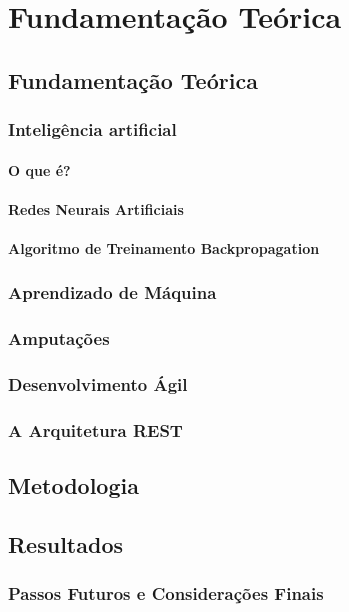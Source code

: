 \part{Fundamentação Teórica}
\chapter[Fundamentação Teórica]{Fundamentação Teórica}

\section{Inteligência artificial}
    \subsection{O que é?}
        
    \subsection{Redes Neurais Artificiais}
        
    \subsection{Algoritmo de Treinamento Backpropagation}
        

\section{Aprendizado de Máquina}
    

\section{Amputações}
    

\section{Desenvolvimento Ágil}
    

\section{A Arquitetura REST}
    
    
\chapter[Metodologia]{Metodologia}
    

\chapter{Resultados}
    
    \section{Passos Futuros e Considerações Finais}
        
